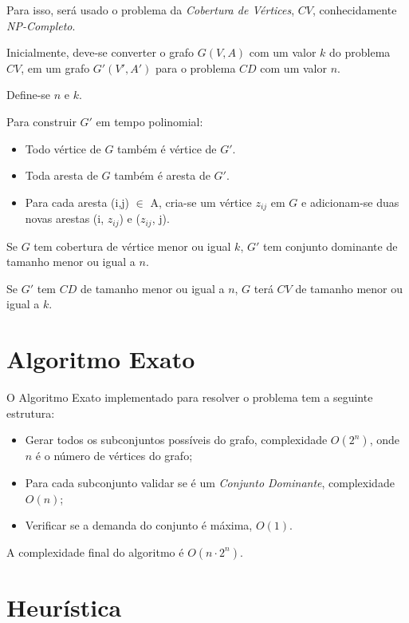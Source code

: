 \documentclass[10pt,a4paper]{article}
\begin{document}
    Para isso, será usado o problema da \emph{Cobertura de Vértices}, $CV$, conhecidamente \emph{NP-Completo}.

    Inicialmente, deve-se converter o grafo $G(V,A)$ com um valor $k$ do problema $CV$, em um grafo $G'(V',A')$ para o problema $CD$ com um valor $n$.

    Define-se $n$ e $k$.

    Para construir $G'$ em tempo polinomial:

    \begin{itemize}

    	\item Todo vértice de $G$ também é vértice de $G'$.
    	\item Toda aresta de $G$ também é aresta de $G'$.
    	\item Para cada aresta (i,j) $\in$ A, cria-se um vértice $z_{ij}$ em $G$ e adicionam-se duas novas arestas (i, $z_{ij}$) e ($z_{ij}$, j).

    \end{itemize}

    Se $G$ tem cobertura de vértice menor ou igual $k$, $G'$ tem conjunto dominante de tamanho menor ou igual a $n$.

    Se $G'$ tem $CD$ de tamanho menor ou igual a $n$, $G$ terá $CV$ de tamanho menor ou igual a $k$.

	\section{Algoritmo Exato}

	O Algoritmo Exato implementado para resolver o problema tem a seguinte estrutura: 

	\begin{itemize}
		\item Gerar todos os subconjuntos possíveis do grafo, complexidade $O(2^n)$, onde $n$ é o número de vértices do grafo;
		\item Para cada subconjunto validar se é um \emph{Conjunto Dominante}, complexidade $O(n)$;
		\item Verificar se a demanda do conjunto é máxima, $O(1)$.
	\end{itemize}

	A complexidade final do algoritmo é $O(n \cdot 2^n)$.
	
	\section{Heurística}
\end{document}
